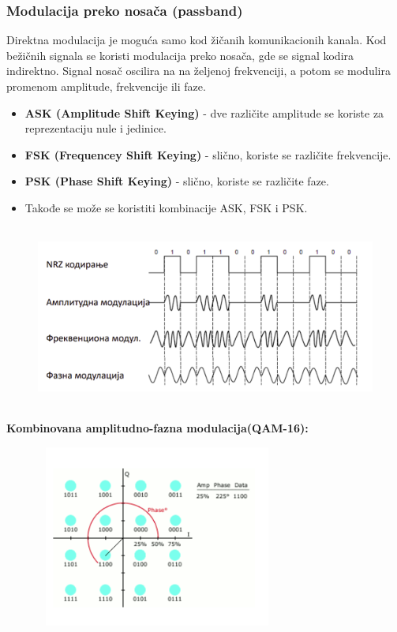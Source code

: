 \documentclass[a4paper]{article}
\begin{document}
        
        \subsubsection{Modulacija preko nosača (passband)}
            Direktna modulacija je moguća samo kod žičanih komunikacionih kanala. Kod bežičnih signala
            se koristi modulacija preko nosača, gde se signal kodira indirektno. Signal nosač oscilira
            na na željenoj frekvenciji, a potom se modulira promenom amplitude, frekvencije ili faze.
            \begin{itemize}
                \item \textbf{ASK (Amplitude Shift Keying)} - dve različite amplitude se koriste za reprezentaciju
                      nule i jedinice.
                \item \textbf{FSK (Frequencey Shift Keying)} - slično, koriste se različite frekvencije.
                \item \textbf{PSK (Phase Shift Keying)} - slično, koriste se različite faze.
                \item Takođe se može se koristiti kombinacije ASK, FSK i PSK.
            \end{itemize}
            \begin{figure}[H]
                \begin{center}
                    \includegraphics[width=120mm,height=60mm]{Slike/kodiranje2.png}
                \end{center}
            \end{figure}
            \textbf{Kombinovana amplitudno-fazna modulacija(QAM-16):}
            \begin{figure}[H]
                \begin{center}
                    \includegraphics[width=80mm,height=60mm]{Slike/kodiranje3.png}
                \end{center}
            \end{figure}
\end{document}
